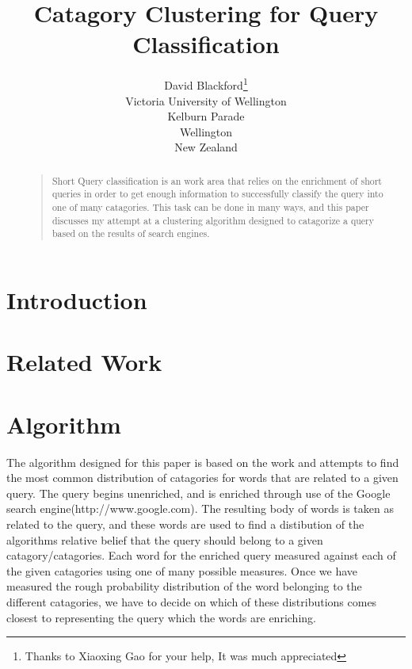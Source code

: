 \documentclass[letterpaper]{article}
\begin{document}
%
\title{Catagory Clustering for Query Classification}
\author{David Blackford\thanks{Thanks to Xiaoxing Gao for your help, It was much appreciated}\\
Victoria University of Wellington\\
Kelburn Parade\\
Wellington\\
New Zealand\\
}
\maketitle
\begin{abstract}
\begin{quote}
Short Query classification is an work area that relies on the enrichment of short queries in order to get enough information to successfully classify the query into 
one of many catagories. This task can be done in many ways, and this paper discusses my attempt at a clustering algorithm designed to catagorize a query based on the results of search engines.
\end{quote}
\end{abstract}
\section{Introduction}

\section{Related Work}



\section{Algorithm}
The algorithm designed for this paper is based on the work \cite{distCluster} and attempts to find the most common distribution of catagories for words that are related
to a given query. The query begins unenriched, and is enriched through use of the Google search engine(http://www.google.com). The resulting body of words is taken
as related to the query, and these words are used to find a distibution of the algorithms relative belief that the query should belong to a given catagory/catagories.
Each word for the enriched query measured against each of the given catagories using one of many possible measures. Once we have measured the rough probability distribution of the word
belonging to the different catagories, we have to decide on which of these distributions comes closest to representing the query which the words are enriching. 
\end{document}
